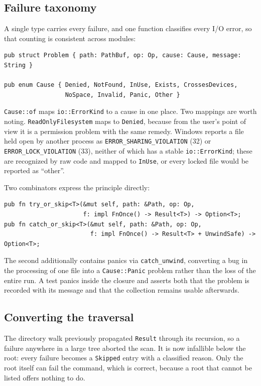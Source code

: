 \documentclass[11pt,a4paper]{article}
\newcommand{\code}[1]{\texttt{\small #1}}
\begin{document}
\subsection{Failure taxonomy}

A single type carries every failure, and one function classifies every I/O error, so
that counting is consistent across modules:

\begin{lstlisting}
pub struct Problem { path: PathBuf, op: Op, cause: Cause, message: String }

pub enum Cause { Denied, NotFound, InUse, Exists, CrossesDevices,
                 NoSpace, Invalid, Panic, Other }
\end{lstlisting}

\code{Cause::of} maps \code{io::ErrorKind} to a cause in one place. Two mappings are
worth noting. \code{ReadOnlyFilesystem} maps to \code{Denied}, because from the user's
point of view it is a permission problem with the same remedy. Windows reports a file
held open by another process as \code{ERROR\_SHARING\_VIOLATION} (32) or
\code{ERROR\_LOCK\_VIOLATION} (33), neither of which has a stable
\code{io::ErrorKind}; these are recognized by raw code and mapped to \code{InUse}, or
every locked file would be reported as \enquote{other}.

Two combinators express the principle directly:

\begin{lstlisting}
pub fn try_or_skip<T>(&mut self, path: &Path, op: Op,
                      f: impl FnOnce() -> Result<T>) -> Option<T>;
pub fn catch_or_skip<T>(&mut self, path: &Path, op: Op,
                        f: impl FnOnce() -> Result<T> + UnwindSafe) -> Option<T>;
\end{lstlisting}

The second additionally contains panics via \code{catch\_unwind}, converting a bug in
the processing of one file into a \code{Cause::Panic} problem rather than the loss of
the entire run. A test panics inside the closure and asserts both that the problem is
recorded with its message and that the collection remains usable afterwards.

\subsection{Converting the traversal}

The directory walk previously propagated \code{Result} through its recursion, so a
failure anywhere in a large tree aborted the scan. It is now infallible below the
root: every failure becomes a \code{Skipped} entry with a classified reason. Only the
root itself can fail the command, which is correct, because a root that cannot be
listed offers nothing to do.
\end{document}
